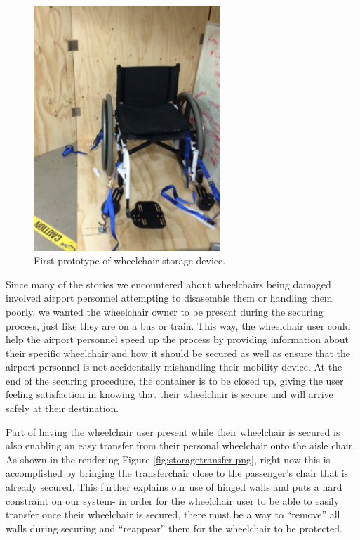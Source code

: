 \begin{figure}[h]
  \centering
     \includegraphics[width=7cm]{images/wheelchairprototype1.png}
   \caption{First prototype of wheelchair storage device.}
  \label{fig:wheelchairprototype1.png}
\end{figure}

Since many of the stories we encountered about wheelchairs being damaged involved airport personnel attempting to disasemble them or handling them poorly, we wanted the wheelchair owner to be present during the securing process, just like they are on a bus or train. This way, the wheelchair user could help the airport personnel speed up the process by providing information about their specific wheelchair and how it should be secured as well as ensure that the airport personnel is not accidentally mishandling their mobility device. At the end of the securing procedure, the container is to be closed up, giving the user feeling satisfaction in knowing that their wheelchair is secure and will arrive safely at their destination. 
 
Part of having the wheelchair user present while their wheelchair is secured is also enabling an easy transfer from their personal wheelchair onto the aisle chair. As shown in the rendering  Figure \ref{fig:storagetransfer.png}, right now this is accomplished by bringing the transferchair close to the passenger's chair that is already secured. This further explains our use of hinged walls and puts a hard constraint on our system- in order for the wheelchair user to be able to easily transfer once their wheelchair is secured, there must be a way to ``remove'' all walls during securing and ``reappear'' them for the wheelchair to be protected.

